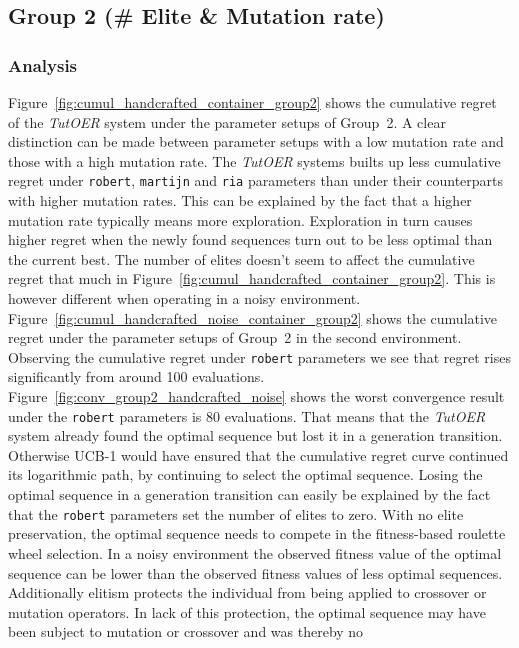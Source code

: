 \subsection{Group 2 (\# Elite \& Mutation rate)}
\label{sec:simulation_handcrafted_group2}
\subsubsection*{Analysis}
Figure~\ref{fig:cumul_handcrafted_container_group2} shows the cumulative regret
of the \emph{TutOER} system under the parameter setups of Group~2. A clear
distinction can be made between parameter setups with a low mutation rate and those
with a high mutation rate. The \emph{TutOER} systems builts up less cumulative
regret under \texttt{robert}, \texttt{martijn} and \texttt{ria} parameters than
under their counterparts with higher mutation rates. This can be explained by
the fact that a higher mutation rate typically means more exploration.
Exploration in turn causes higher regret when the newly found sequences turn out to be
less optimal than the current best. The number of elites doesn't seem to affect
the cumulative regret that much in
Figure~\ref{fig:cumul_handcrafted_container_group2}. This is however different
when operating in a noisy environment.
Figure~\ref{fig:cumul_handcrafted_noise_container_group2} shows the cumulative
regret under the parameter setups of Group~2 in the second environment. Observing
the cumulative regret under \texttt{robert} parameters we see that regret rises
significantly from around 100 evaluations.
Figure~\ref{fig:conv_group2_handcrafted_noise} shows the worst convergence result
under the \texttt{robert} parameters is 80 evaluations. That means that the
\emph{TutOER} system already found the optimal sequence but lost it in a
generation transition. Otherwise UCB-1 would have ensured that the
cumulative regret curve continued its logarithmic path, by continuing to select
the optimal sequence. Losing the optimal
sequence in a generation transition can easily be explained by the fact that
the \texttt{robert} parameters set the number of elites to zero. With no elite
preservation, the optimal sequence needs to compete in the fitness-based
roulette wheel selection. In a noisy environment the observed fitness value of
the optimal sequence can be lower than the observed fitness values of less optimal
sequences. Additionally elitism protects the individual from being applied to
crossover or mutation operators. In lack of this protection, the optimal
sequence may have been subject to mutation or crossover and was thereby no
